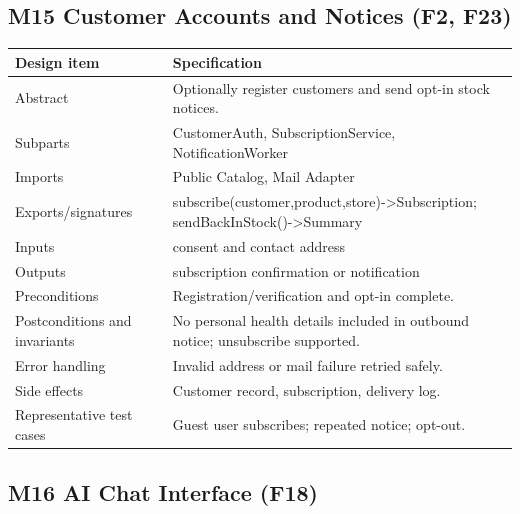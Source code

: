 \subsection{M15 Customer Accounts and Notices (F2, F23)}\label{m15-customer-accounts-and-notices-f2-f23}

{\def\LTcaptype{none} %
\begin{longtable}[]{|
  >{\raggedright\arraybackslash}m{}|
  >{\raggedright\arraybackslash}m{}|}
\hline
\begin{minipage}[c]{\linewidth}\raggedright
\textbf{Design item}
\end{minipage} & \begin{minipage}[c]{\linewidth}\raggedright
\textbf{Specification}
\end{minipage} \\
\hline
\endhead

\endlastfoot
Abstract & Optionally register customers and send opt-in stock notices. \\ \hline
Subparts & CustomerAuth, SubscriptionService, NotificationWorker \\ \hline
Imports & Public Catalog, Mail Adapter \\ \hline
Exports/signatures & subscribe(customer,product,store)-\textgreater Subscription; sendBackInStock()-\textgreater Summary \\ \hline
Inputs & consent and contact address \\ \hline
Outputs & subscription confirmation or notification \\ \hline
Preconditions & Registration/verification and opt-in complete. \\ \hline
Postconditions and invariants & No personal health details included in outbound notice; unsubscribe supported. \\ \hline
Error handling & Invalid address or mail failure retried safely. \\ \hline
Side effects & Customer record, subscription, delivery log. \\ \hline
Representative test cases & Guest user subscribes; repeated notice; opt-out. \\ \hline
\end{longtable}
}

\subsection{M16 AI Chat Interface (F18)}\label{m16-ai-chat-interface-f15-f18}

